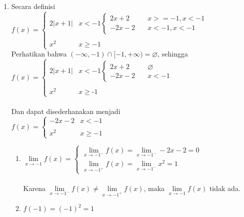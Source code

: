 \documentclass[10pt,openany,a4paper]{article}
\begin{document}
\begin{enumerate}
            \item Secara definisi $f(x)=\begin{cases}
        2|x+1|&   x < -1\begin{cases}
            2x+2&\quad x>=-1,x<-1\\
             -2x-2&\quad x<-1,x<-1
        \end{cases}\\
        \\
        x^2 &   x \geq -1
        \end{cases}$\\
        Perhatikan bahwa $(-\infty,-1)\cap[-1,+\infty)=\varnothing$, sehingga\\
        $f(x)=\begin{cases}
        2|x+1|&   x < -1\begin{cases}
            2x+2&\quad \varnothing\\
             -2x-2&\quad x<-1
        \end{cases}\\
        \\
        x^2 &   x \geq ‐1
        \end{cases}$\\~\\
        Dan dapat disederhanakan menjadi\\
        \fancyhead[l]{}
        $f(x)=\begin{cases}
        -2x-2&   x < -1\\
        \\
        x^2 &   x \geq -1
        \end{cases}$
        \begin{enumerate}
            \item $\lim\limits_{x\to-1}f(x)=\begin{cases}
                    \lim\limits_{x\to-1^-}f(x)=\lim\limits_{x\to-1^-}-2x-2=0\\
                    \lim\limits_{x\to-1^+}f(x)=\lim\limits_{x\to-1^-}x^2=1
                \end{cases}$\\~\\
                Karena $\lim\limits_{x\to-1^-}f(x)\neq\lim\limits_{x\to-1^+}f(x)$, maka $\lim\limits_{x\to-1}f(x)$ tidak ada.\\

            \item $f(-1)=(-1)^2=1$\\
            

\end{enumerate}
\end{enumerate}
\end{document}
